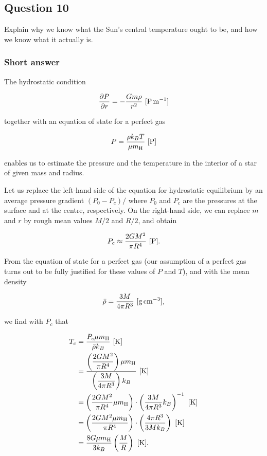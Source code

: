 \documentclass[a4paper,10pt]{article}
\begin{document}
\newpage
\subsection{Question 10}

Explain why we know what the Sun's central temperature ought to be, and how we know what it actually is.

\subsubsection{Short answer}

The hydrostatic condition

\begin{align*}
    \frac{\partial P}{\partial r} = -\frac{Gm\rho}{r^2} ~ [{\rm P\,m^{-1}}]
\end{align*}

{\noindent}together with an equation of state for a perfect gas

\begin{align*}
    P = \frac{\rho k_BT}{\mu m_{\rm H}} ~ [{\rm P}]
\end{align*}

{\noindent}enables us to estimate the pressure and the temperature in the interior of a star of given mass and radius.

{\noindent}Let us replace the left-hand side of the equation for hydrostatic equilibrium by an average pressure gradient $(P_0-P_c)/$ where $P_0$ and $P_c$ are the pressures at the surface and at the centre, respectively. On the right-hand side, we can replace $m$ and $r$ by rough mean values $M/2$ and $R/2$, and obtain

\begin{align*}
    P_c \approx \frac{2GM^2}{\pi R^4} ~ [{\rm P}].
\end{align*}

{\noindent}From the equation of state for a perfect gas (our assumption of a perfect gas turns out to be fully justified for these values of $P$ and $T$), and with the mean density

\begin{align*}
    \bar{\rho} = \frac{3M}{4\pi R^3} ~ [{\rm g\,cm^{-3}}],
\end{align*}

{\noindent}we find with $P_c$ that

\begin{align*}
    T_c &= \frac{P_c\mu m_{\rm H}}{\bar{\rho} k_B} ~ [{\rm K}] \\
    &= \frac{\left(\dfrac{2GM^2}{\pi R^4}\right)\mu m_{\rm H}}{\left(\dfrac{3M}{4\pi R^3}\right) k_B} ~ [{\rm K}] \\
    &= \left(\frac{2GM^2}{\pi R^4}\mu m_{\rm H}\right) \cdot \left(\frac{3M}{4\pi R^3}k_B\right)^{-1} ~ [{\rm K}] \\
    &= \left(\frac{2GM^2\mu m_{\rm H}}{\pi R^4}\right) \cdot \left(\frac{4\pi R^3}{3Mk_B}\right) ~ [{\rm K}] \\
    &= \frac{8G\mu m_{\rm H}}{3k_B}\left(\frac{M}{R}\right) ~ [{\rm K}].
\end{align*}
\end{document}
